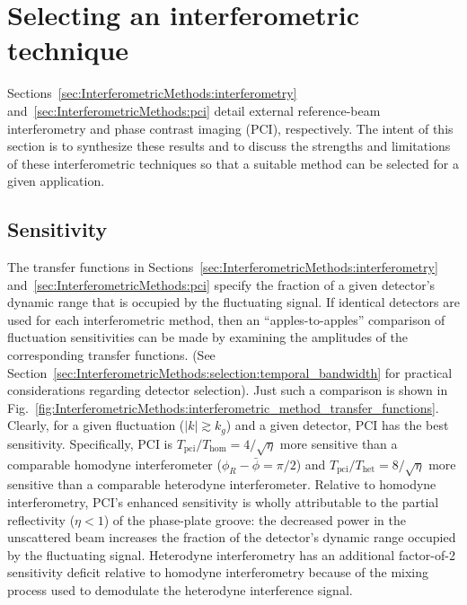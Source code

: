 \section{Selecting an interferometric technique}
\label{sec:InterferometricMethods:selection}
Sections~\ref{sec:InterferometricMethods:interferometry}
and~\ref{sec:InterferometricMethods:pci}
detail external reference-beam interferometry and
phase contrast imaging (PCI), respectively.
The intent of this section is to synthesize these results and
to discuss the strengths and limitations
of these interferometric techniques
so that a suitable method can be selected for a given application.


\subsection{Sensitivity}
\label{sec:InterferometricMethods:selection:sensitivity}
The transfer functions in
Sections~\ref{sec:InterferometricMethods:interferometry}
and~\ref{sec:InterferometricMethods:pci}
specify the fraction of a given detector's dynamic range
that is occupied by the fluctuating signal.
If identical detectors are used for each interferometric method,
then an ``apples-to-apples'' comparison of fluctuation sensitivities
can be made by examining the amplitudes
of the corresponding transfer functions.
(See Section~\ref{sec:InterferometricMethods:selection:temporal_bandwidth}
for practical considerations regarding detector selection).
Just such a comparison is shown in
Fig.~\ref{fig:InterferometricMethods:interferometric_method_transfer_functions}.
Clearly, for a given fluctuation ($|k| \gtrsim k_g$) and a given detector,
PCI has the best sensitivity.
Specifically, PCI is
$T_{\text{pci}} / T_{\text{hom}} = 4 / \sqrt{\eta}$
more sensitive than a comparable homodyne interferometer
($\phi_R - \bar{\phi} = \pi / 2$) and
$T_{\text{pci}} / T_{\text{het}} = 8 / \sqrt{\eta}$
more sensitive than a comparable heterodyne interferometer.
Relative to homodyne interferometry,
PCI's enhanced sensitivity is wholly attributable
to the partial reflectivity ($\eta < 1$) of the phase-plate groove:
the decreased power in the unscattered beam
increases the fraction of the detector's dynamic range
occupied by the fluctuating signal.
Heterodyne interferometry has an additional factor-of-2 sensitivity deficit
relative to homodyne interferometry because of the mixing process
used to demodulate the heterodyne interference signal.

